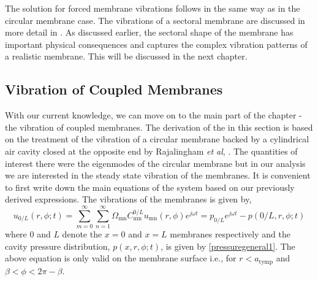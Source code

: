 The solution for forced membrane vibrations follows in the same way as in the circular membrane case. The vibrations of a sectoral membrane
are discussed in more detail in \cite[p.~87]{fletcheracoustic}. As discussed earlier, the sectoral shape of the membrane has important
physical consequences and captures the complex vibration patterns of a realistic membrane. This will be discussed in the next chapter.
\subsection{Vibration of Coupled Membranes}\label{coupledmembranes}
With our current knowledge, we can move on to the main part of the chapter - the vibration of coupled membranes. 
The derivation of the in this section is based on the treatment of the vibration of a circular membrane backed by
a cylindrical air cavity closed at the opposite end by Rajalingham \emph{et al}, \cite{rajalinghambhat}. The quantities of
interest there were the eigenmodes of the circular membrane but in our analysis we are interested in the steady state vibration
of the membranes.
It is convenient to first write down the main equations of the system based on our previously derived expressions.
The vibrations of the membranes is given by,
\begin{equation}\label{coupledmembraneseries}
 u_{0/L}(r,\phi;t)=\displaystyle\sum^{\infty}_{m=0}\sum^{\infty}_{n=1}\Omega_{\mathrm{mn}}C^{0/L}_{\mathrm{mn}}u_{\mathrm{mn}}(r,\phi)e^{j\omega t}=p_{0/L}e^{j\omega t}-p(0/L,r,\phi;t)
\end{equation}
where $0$ and $L$ denote the $x=0$ and $x=L$ membranes respectively and the cavity pressure distribution, $p(x,r,\phi;t)$,  is given by \eqref{pressuregeneral1}.
The above equation is only valid on the membrane surface i.e., for $r<a_{\mathrm{tymp}}$ and $\beta<\phi<2\pi-\beta$.

